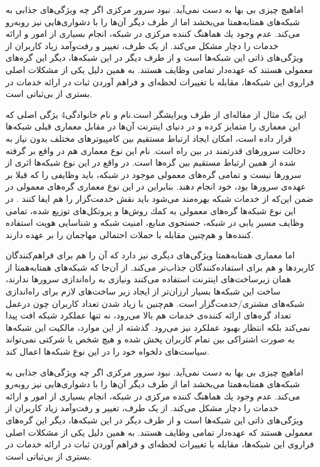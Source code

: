 \documentclass[12pt,twoside]{xepersian-magazine}
\begin{document}
\begin{article}{1}
اماهيچ چيزی بی‌ بها به دست نمی‌آید. نبود سرور مرکزی اگر چه  ويژگی‌های جذابی به شبکه‌های همتابه‌همتا می‌بخشد اما از طرف ديگر آن‌ها را با دشواری‌هايی نيز روبه‌رو می‌کند.  عدم وجود يك هماهنگ كننده مركزی در شبكه، انجام بسياری از امور و ارائه خدمات را  دچار مشكل می‌کند.  از يک طرف، تغيير و رفت‌وآمد زیاد کاربران از ويژگی‌های ذاتی اين شبکه‌ها است و از طرف ديگر در اين شبكه‌ها، ديگر اين گره‌های معمولی  هستند كه  عهده‌دار تمامی وظايف هستند. به همين دلیل يکی از مشکلات اصلی فراروی اين شبكه‌ها، مقابله با  تغييرات لحظه‌ای و فراهم آوردن ثبات در ارائه  خدمات در بستری از بی‌ثباتی است.  
\end{article}

\articlesep


\begin{editorial}{1}{این یک مثال از مقاله‌ای از طرف ویرایشگر است.}{نام و نام خانوادگی}{4}
يژگی اصلی که اين معماری را متمايز کرده و در دنيای اينترنت آن‌ها در مقابل معماری قبلی شبكه‌ها قرار داده است، امكان ايجاد ارتباط مستقيم  بين كامپيوترهای مختلف بدون نياز به دخالت سرورهای قدرتمند در بين راه است.  نام‌ اين نوع معماری هم در واقع بر گرفته شده از همین  ارتباط مستقیم بين گره‌ها است.  در واقع در اين نوع شبكه‌ها اثری از سرورها نيست و تمامی گره‌های معمولی موجود در شبكه، بايد وظايفی را که قبلا بر عهده‌ی سرورها بود، خود انجام دهند. بنابراين در اين نوع معماری گره‌های معمولی در ضمن اين‌که از خدمات شبکه بهره‌مند می‌شود بايد نقش خدمت‌گزار را هم ايفا کنند . در اين نوع شبکه‌ها گره‌های معمولی به كمك روش‌ها و پروتكل‌های توزيع شده، تمامی وظايف  مسير يابی در شبكه، جستجوی منابع، امنيت شبكه و شناسايی هويت استفاده كننده‌ها و هم‌چنين مقابله با حملات احتمالی مهاجمان را بر عهده دارند.

اما معماری همتابه‌همتا ويژگی‌های ديگری نيز دارد که آن را هم برای فراهم‌کنندگان کاربردها و هم برای استفاده‌کنندگان جذاب‌تر می‌کند.  از آن‌جا که شبکه‌های همتابه‌همتا از همان زيرساخت‌های اينترنت استفاده می‌کنند ونيازی به راه‌اندازی سرورها ندارند، ساخت اين شبكه‌ها بسيار ارزان‌تر از ايجاد زير ساخت‌های لازم برای راه‌اندازی شبكه‌های مشتری/خدمت‌گزار است.  هم‌چنين با زياد شدن تعداد کاربران چون درعمل تعداد گره‌های ارائه کننده‌ی خدمات هم بالا می‌رود، نه تنها عملكرد شبكه افت پيدا نمی‌كند بلكه انتظار بهبود عملکرد نيز می‌رود. گذشته از اين موارد، مالكيت اين شبكه‌ها به صورت اشتراكی بين تمام کاربران پخش شده و هيچ شخص يا شركتی نمی‌تواند سياست‌های دلخواه خود را در اين نوع شبكه‌ها اعمال کند.

اماهيچ چيزی بی‌ بها به دست نمی‌آید. نبود سرور مرکزی اگر چه  ويژگی‌های جذابی به شبکه‌های همتابه‌همتا می‌بخشد اما از طرف ديگر آن‌ها را با دشواری‌هايی نيز روبه‌رو می‌کند.  عدم وجود يك هماهنگ كننده مركزی در شبكه، انجام بسياری از امور و ارائه خدمات را  دچار مشكل می‌کند.  از يک طرف، تغيير و رفت‌وآمد زیاد کاربران از ويژگی‌های ذاتی اين شبکه‌ها است و از طرف ديگر در اين شبكه‌ها، ديگر اين گره‌های معمولی  هستند كه  عهده‌دار تمامی وظايف هستند. به همين دلیل يکی از مشکلات اصلی فراروی اين شبكه‌ها، مقابله با  تغييرات لحظه‌ای و فراهم آوردن ثبات در ارائه  خدمات در بستری از بی‌ثباتی است.
\end{editorial}
\end{document}
